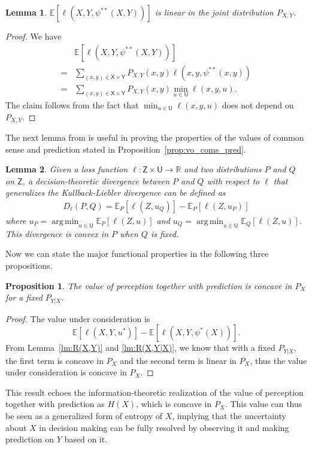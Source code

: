 \documentclass{article}
\newtheorem{lemma}{Lemma}
\newtheorem{proposition}{Proposition}
\newcommand{\R}{\mathbb{R}}
\newcommand{\E}{\mathbb{E}}
\DeclareMathOperator*{\argmin}{arg\,min}
\def\sU{{\mathsf U}}
\def\sX{{\mathsf X}}
\def\sY{{\mathsf Y}}
\def\sZ{{\mathsf Z}}
\begin{document}
\begin{lemma}\label{lm:R(X,Y|X,Y)}
$\E[\ell(X,Y,\psi^{**}(X,Y))]$ is linear in the joint distribution $P_{X,Y}$.
\end{lemma}
\begin{proof}\label{appd:pf_lm_R(X,Y|X,Y)}
We have
\begin{align}
& \E[\ell(X,Y,\psi^{**}(X,Y))] \nonumber \\
=& \sum_{(x,y)\in\sX\times\sY}P_{X,Y}(x,y) \ell(x,y,\psi^{**}(x,y)) \\
=& \sum_{(x,y)\in\sX\times\sY}P_{X,Y}(x,y) \min_{u\in\sU} \ell(x,y,u) .
\end{align}   
The claim follows from the fact that $\min_{u\in\sU} \ell(x,y,u)$ does not depend on $P_{X,Y}$.
\end{proof}

The next lemma from \cite{max_gen_ent} is useful in proving the properties of the values of common sense and prediction stated in Proposition~\ref{prop:vo_coms_pred}.
\begin{lemma}\label{lm:D_ell}
Given a loss function $\ell:\sZ\times\sU\rightarrow\R$ and two distributions $P$ and $Q$ on $\sZ$, a decision-theoretic divergence between $P$ and $Q$ with respect to $\ell$ that generalizes the Kullback-Liebler divergence can be defined as
\begin{align}
D_\ell(P,Q) = \E_P[\ell(Z,u_Q)] - \E_P[\ell(Z,u_P)]
\end{align}
where $u_P = \argmin_{u\in\sU}\E_P[\ell(Z,u)]$ and $u_Q = \argmin_{u\in\sU}\E_Q[\ell(Z,u)]$.
This divergence is convex in $P$ when $Q$ is fixed.
\end{lemma}

Now we can state the major functional properties in the following three propositions.
\begin{proposition}\label{prop:vo_percep_pred}
    The value of perception together with prediction is concave in $P_X$
    for a fixed $P_{Y|X}$.
\end{proposition}
\begin{proof}
The value under consideration is $$\E[\ell(X,Y,u^*)] - \E[\ell(X,Y,\psi^*(X))].$$
From Lemma~\ref{lm:R(X,Y)} and \ref{lm:R(X,Y|X)}, we know that with a fixed $P_{Y|X}$, the first term is concave in $P_X$ and the second term is linear in $P_X$, thus the value under consideration is concave in $P_X$.
\end{proof}
This result echoes the information-theoretic realization of the value of perception together with prediction as $H(X)$, which is concave in $P_X$. This value can thus be seen as a generalized form of entropy of $X$, implying that the uncertainty about $X$ in decision making can be fully resolved by observing it and making prediction on $Y$ based on it.
\end{document}
